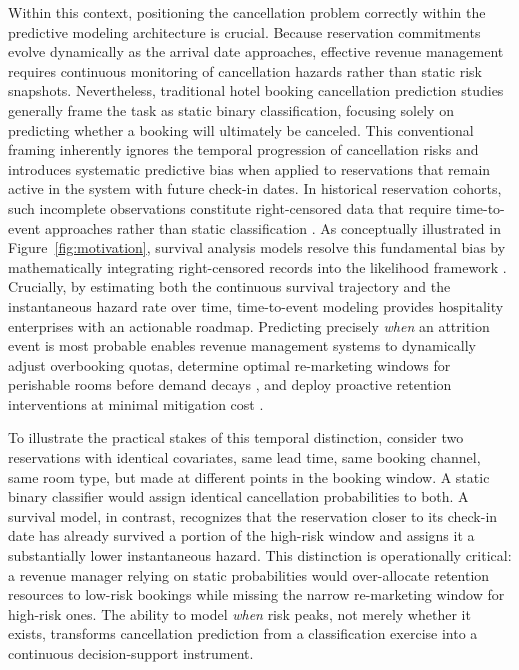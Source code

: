 \documentclass[pdflatex,iicol,sn-mathphys-ay]{sn-jnl}
\theoremstyle{thmstyleone}%
\theoremstyle{thmstyletwo}%
\theoremstyle{thmstylethree}%
\begin{document}
Within this context, positioning the cancellation problem correctly within the predictive modeling architecture is crucial. Because reservation commitments evolve dynamically as the arrival date approaches, effective revenue management requires continuous monitoring of cancellation hazards rather than static risk snapshots. Nevertheless, traditional hotel booking cancellation prediction studies generally frame the task as static binary classification, focusing solely on predicting whether a booking will ultimately be canceled. This conventional framing inherently ignores the temporal progression of cancellation risks and introduces systematic predictive bias when applied to reservations that remain active in the system with future check-in dates. In historical reservation cohorts, such incomplete observations constitute right-censored data that require time-to-event approaches rather than static classification \citep{kleinbaum2012survival, langbein2025interpretable}. As conceptually illustrated in Figure~\ref{fig:motivation}, survival analysis models resolve this fundamental bias by mathematically integrating right-censored records into the likelihood framework \citep{kovalev2020survlime, langbein2025interpretable}. Crucially, by estimating both the continuous survival trajectory and the instantaneous hazard rate over time, time-to-event modeling provides hospitality enterprises with an actionable roadmap. Predicting precisely \textit{when} an attrition event is most probable enables revenue management systems to dynamically adjust overbooking quotas, determine optimal re-marketing windows for perishable rooms before demand decays \citep{mir2026decoding}, and deploy proactive retention interventions at minimal mitigation cost \citep{antonio2017predicting, ampountolas2025predicting}.

To illustrate the practical stakes of this temporal distinction, consider two reservations with identical covariates, same lead time, same booking channel, same room type, but made at different points in the booking window. A static binary classifier would assign identical cancellation probabilities to both. A survival model, in contrast, recognizes that the reservation closer to its check-in date has already survived a portion of the high-risk window and assigns it a substantially lower instantaneous hazard. This distinction is operationally critical: a revenue manager relying on static probabilities would over-allocate retention resources to low-risk bookings while missing the narrow re-marketing window for high-risk ones. The ability to model \textit{when} risk peaks, not merely whether it exists, transforms cancellation prediction from a classification exercise into a continuous decision-support instrument.
\end{document}
